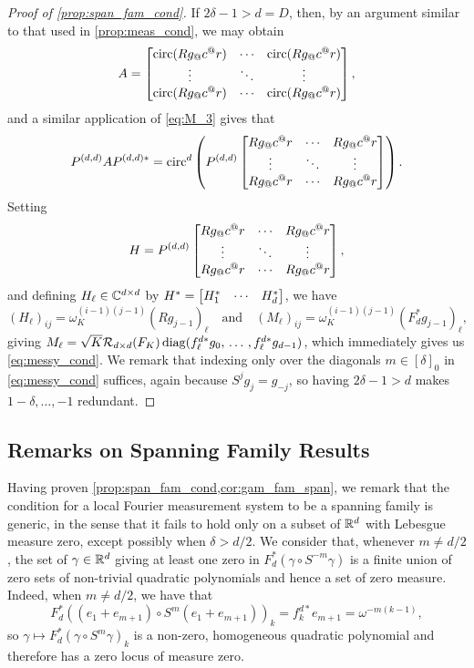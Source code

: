 \begin{proof}[Proof of \cref{prop:span_fam_cond}]
  If $2 \delta - 1 > d = D$, then, by an argument similar to that used in \cref{prop:meas_cond}, we may obtain \[A = \cornmatfun{\circop(R g_@c^@r)}{1}{d}{0}{d - 1},\] and a similar application of \eqref{eq:M_3} gives that \[P^{(d, d)} A P^{(d, d)*} = \circop^d\left( P^{(d, d)} \cornmatfun{R g_@c^@r}{1}{d}{0}{d - 1} \right).\]  Setting \[H = P^{(d, d)} \cornmatfun{R g_@c^@r}{1}{d}{0}{d - 1},\] and defining $H_\ell \in \mathbb{C}^{d \times d}$ by $H^* = \begin{bmatrix} H^*_{1} & \cdots & H^*_{d} \end{bmatrix}$, %
  we have \[(H_\ell)_{ij} = \omega_K^{(i - 1)(j - 1)} (R g_{j - 1})_\ell \quad \text{and} \quad (M_\ell)_{ij} = \omega_K^{(i - 1)(j - 1)} (F_d^* g_{j - 1})_\ell,\] giving $M_\ell = \sqrt{K} \mathcal{R}_{d \times d}(F_K) \operatorname{diag}(f_\ell^{d*} g_0,\, \ldots\, , f_\ell^{d*} g_{d - 1})$, which immediately gives us \eqref{eq:messy_cond}.  We remark that indexing only over the diagonals $m \in [\delta]_0$ in \eqref{eq:messy_cond} suffices, again because $S^j g_j = g_{-j}$, so having $2 \delta - 1 > d$ makes $1 - \delta, \ldots, -1$ redundant.
  
\end{proof}

\subsection{Remarks on Spanning Family Results}
\label{sec:span_fam_remarks}

Having proven \cref{prop:span_fam_cond,cor:gam_fam_span}, we remark that the condition for a local Fourier measurement system to be a spanning family is generic, in the sense that it fails to hold only on a subset of $\mathbb{R}^d$ with Lebesgue measure zero, except possibly when $\delta > d / 2$.  We consider that, whenever $m \neq d / 2$, the set of $\gamma \in \mathbb{R}^d$ giving at least one zero in $F_d^*(\gamma \circ S^{-m} \gamma)$ is a finite union of zero sets of non-trivial quadratic polynomials and hence a set of zero measure.  %
Indeed, when $m \neq d / 2$, we have that \[F_d^*((e_1 + e_{m + 1}) \circ S^m(e_1 + e_{m + 1}))_k = f_k^{d*} e_{m + 1} = \omega^{-m(k-1)},\] so $\gamma \mapsto F_d^*(\gamma \circ S^m \gamma)_k$ is a non-zero, homogeneous quadratic polynomial and therefore has a zero locus of measure zero.

